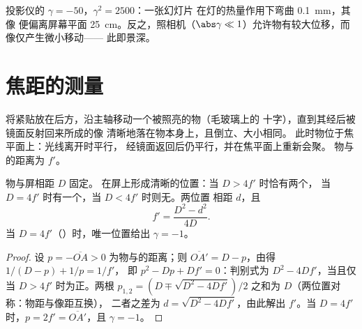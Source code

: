 \begin{remark}[焦深]\label{rem:b1:mirrors-thin-lenses:depth}
投影仪的 $\gamma = -50$，$\gamma^2 = 2500$：一张幻灯片
在灯的热量作用下弯曲 \qty{0.1}{mm}，其像
便偏离屏幕平面 \qty{25}{cm}。反之，照相机（$\abs\gamma
\ll 1$）允许物有较大位移，而像仅产生微小移动——
此即景深。
\end{remark}

\section{焦距的测量}

\begin{method}[自准直法]\label{met:b1:mirrors-thin-lenses:autocollimation}
将紧贴放在后方，沿主轴移动一个被照亮的物（毛玻璃上的
十字），直到其经后被镜面反射回来所成的像
清晰地落在物本身上，且倒立、大小相同。
此时物位于焦平面上：光线离开时平行，
经镜面返回后仍平行，并在焦平面上重新会聚。
物与的距离为 $f'$。
\end{method}

\begin{proposition}[贝塞尔法]\label{prop:b1:mirrors-thin-lenses:bessel}
物与屏相距 $D$ 固定。
在屏上形成清晰的位置：当 $D > 4f'$ 时恰有两个，
当 $D = 4f'$ 时有一个，当 $D < 4f'$ 时则无。两位置
相距 $d$，且
\[
f' = \frac{D^2 - d^2}{4D} .
\]
当 $D = 4f'$（）时，唯一位置给出 $\gamma = -1$。
\end{proposition}

\begin{proof}
设 $p = -\overline{OA} > 0$ 为物与的距离；则
$\overline{OA'} = D - p$，由得 $1/(D - p) + 1/p = 1/f'$，
即 $p^2 - Dp + Df' = 0$：判别式为 $D^2 - 4Df'$，当且仅当
$D > 4f'$ 时为正。两根 $p_{1,2} = (D \mp \sqrt{D^2 - 4Df'})/2$ 之和为
$D$（两位置对称：物距与像距互换），
二者之差为 $d = \sqrt{D^2 - 4Df'}$，由此解出 $f'$。当
$D = 4f'$ 时，$p = 2f' = \overline{OA'}$，且 $\gamma = -1$。
\end{proof}

